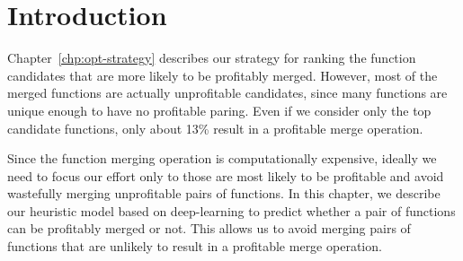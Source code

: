 \section{Introduction}
\label{sec:introduction}


Chapter~\ref{chp:opt-strategy} describes our strategy for ranking the function candidates that are more likely to be profitably merged.
However, most of the merged functions are actually unprofitable candidates, since many functions are unique enough to have no profitable paring.
Even if we consider only the top candidate functions, only about 13\% result in a profitable merge operation.

Since the function merging operation is computationally expensive, ideally we need to focus our effort only to those are most likely to be profitable and avoid wastefully merging unprofitable pairs of functions.
In this chapter, we describe our heuristic model based on deep-learning to predict whether a pair of functions can be
profitably merged or not.
This allows us to avoid merging pairs of functions that are unlikely to result in a profitable merge operation.


